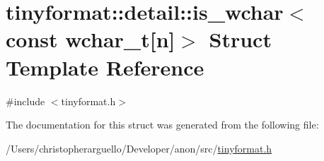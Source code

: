 \hypertarget{structtinyformat_1_1detail_1_1is__wchar_3_01const_01wchar__t[n]_4}{}\section{tinyformat\+:\+:detail\+:\+:is\+\_\+wchar$<$ const wchar\+\_\+t\mbox{[}n\mbox{]}$>$ Struct Template Reference}
\label{structtinyformat_1_1detail_1_1is__wchar_3_01const_01wchar__t[n]_4}


{\ttfamily \#include $<$tinyformat.\+h$>$}



The documentation for this struct was generated from the following file\+:\begin{DoxyCompactItemize}
\item 
/\+Users/christopherarguello/\+Developer/anon/src/\mbox{\hyperlink{tinyformat_8h}{tinyformat.\+h}}\end{DoxyCompactItemize}
